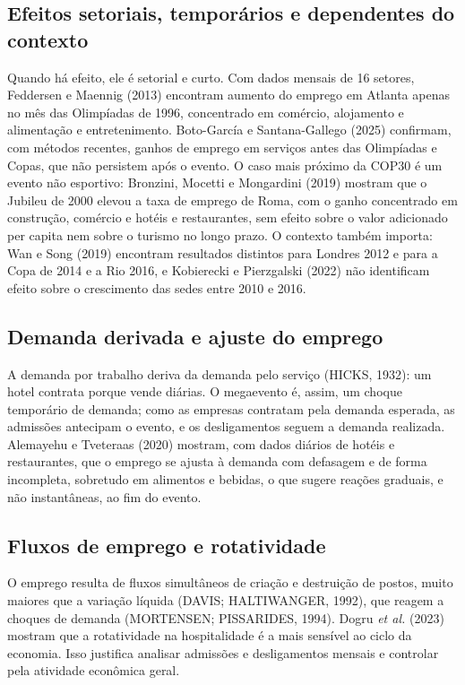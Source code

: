 \documentclass[12pt,a4paper]{article}
\begin{document}
\subsection{Efeitos setoriais, temporários e dependentes do contexto}

Quando há efeito, ele é setorial e curto. Com dados mensais de 16 setores,
Feddersen e Maennig (2013) encontram aumento do emprego em Atlanta apenas no
mês das Olimpíadas de 1996, concentrado em comércio, alojamento e alimentação e
entretenimento. Boto-García e Santana-Gallego (2025) confirmam, com métodos
recentes, ganhos de emprego em serviços antes das Olimpíadas e Copas, que não
persistem após o evento. O caso mais próximo da COP30 é um evento não
esportivo: Bronzini, Mocetti e Mongardini (2019) mostram que o Jubileu de 2000
elevou a taxa de emprego de Roma, com o ganho concentrado em construção,
comércio e hotéis e restaurantes, sem efeito sobre o valor adicionado per
capita nem sobre o turismo no longo prazo. O contexto também importa: Wan e
Song (2019) encontram resultados distintos para Londres 2012 e para a Copa de
2014 e a Rio 2016, e Kobierecki e Pierzgalski (2022) não identificam efeito
sobre o crescimento das sedes entre 2010 e 2016.

\subsection{Demanda derivada e ajuste do emprego}

A demanda por trabalho deriva da demanda pelo serviço (HICKS, 1932): um hotel
contrata porque vende diárias. O megaevento é, assim, um choque temporário de
demanda; como as empresas contratam pela demanda esperada, as admissões
antecipam o evento, e os desligamentos seguem a demanda realizada. Alemayehu e
Tveteraas (2020) mostram, com dados diários de hotéis e restaurantes, que o
emprego se ajusta à demanda com defasagem e de forma incompleta, sobretudo em
alimentos e bebidas, o que sugere reações graduais, e não instantâneas, ao fim
do evento.

\subsection{Fluxos de emprego e rotatividade}

O emprego resulta de fluxos simultâneos de criação e destruição de postos,
muito maiores que a variação líquida (DAVIS; HALTIWANGER, 1992), que reagem a
choques de demanda (MORTENSEN; PISSARIDES, 1994). Dogru \textit{et al.} (2023)
mostram que a rotatividade na hospitalidade é a mais sensível ao ciclo da
economia. Isso justifica analisar admissões e desligamentos mensais e
controlar pela atividade econômica geral.
\end{document}
